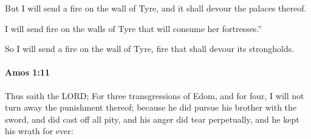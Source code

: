 			\begin{versebox}
					\item[BHS] 
					\item[LXX] 
					\item[ASV] But I will send a fire on the wall of Tyre, and it shall devour the palaces thereof.
					\item[NIV] I will send fire on the walls of Tyre that will consume her fortresses.”
					\item[NRSV] So I will send a fire on the wall of Tyre, fire that shall devour its strongholds.
			\end{versebox}

		\paragraph{Amos 1:11} %
			\label{AMOS-1-11}

			Thus saith the LORD; For three transgressions of Edom, and for four, I will not turn away the punishment thereof; because he did pursue his brother with the sword, and did cast off all pity, and his anger did tear perpetually, and he kept his wrath for ever:

